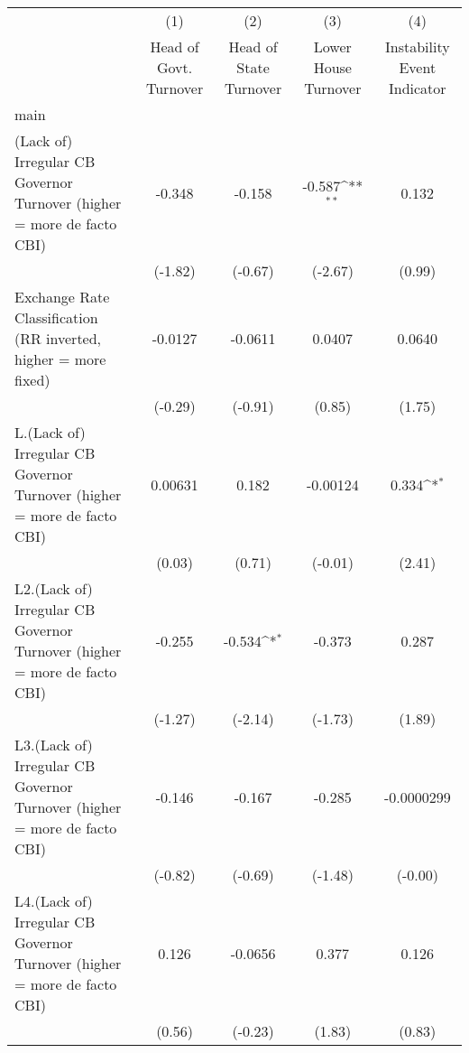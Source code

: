 {
\def\sym#1{\ifmmode^{#1}\else\(^{#1}\)\fi}
\begin{longtable}{l*{4}{c}}
\toprule\endfirsthead\midrule\endhead\midrule\endfoot\endlastfoot
                &\multicolumn{1}{c}{(1)}&\multicolumn{1}{c}{(2)}&\multicolumn{1}{c}{(3)}&\multicolumn{1}{c}{(4)}\\
                &\multicolumn{1}{c}{Head of Govt. Turnover}&\multicolumn{1}{c}{Head of State Turnover}&\multicolumn{1}{c}{Lower House Turnover}&\multicolumn{1}{c}{Instability Event Indicator}\\
\midrule
main            &                  &                  &                  &                  \\
(Lack of) Irregular CB Governor Turnover (higher = more de facto CBI)&   -0.348         &   -0.158         &   -0.587\sym{**} &    0.132         \\
                &  (-1.82)         &  (-0.67)         &  (-2.67)         &   (0.99)         \\
\addlinespace
Exchange Rate Classification (RR inverted, higher = more fixed)&  -0.0127         &  -0.0611         &   0.0407         &   0.0640         \\
                &  (-0.29)         &  (-0.91)         &   (0.85)         &   (1.75)         \\
\addlinespace
L.(Lack of) Irregular CB Governor Turnover (higher = more de facto CBI)&  0.00631         &    0.182         & -0.00124         &    0.334\sym{*}  \\
                &   (0.03)         &   (0.71)         &  (-0.01)         &   (2.41)         \\
\addlinespace
L2.(Lack of) Irregular CB Governor Turnover (higher = more de facto CBI)&   -0.255         &   -0.534\sym{*}  &   -0.373         &    0.287         \\
                &  (-1.27)         &  (-2.14)         &  (-1.73)         &   (1.89)         \\
\addlinespace
L3.(Lack of) Irregular CB Governor Turnover (higher = more de facto CBI)&   -0.146         &   -0.167         &   -0.285         &-0.0000299         \\
                &  (-0.82)         &  (-0.69)         &  (-1.48)         &  (-0.00)         \\
\addlinespace
L4.(Lack of) Irregular CB Governor Turnover (higher = more de facto CBI)&    0.126         &  -0.0656         &    0.377         &    0.126         \\
                &   (0.56)         &  (-0.23)         &   (1.83)         &   (0.83)         \\

\end{longtable}}
